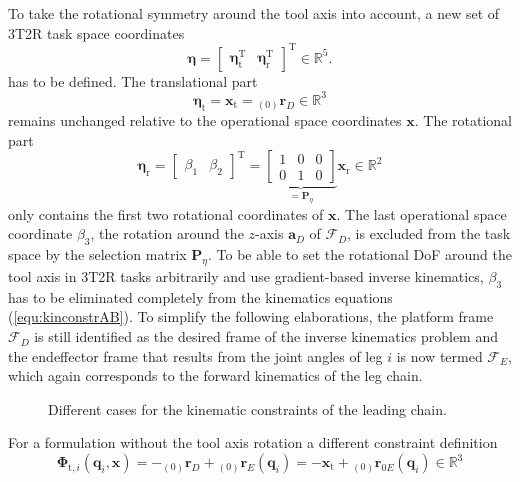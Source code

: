 \documentclass[robotics,article,submit,moreauthors,pdftex]{Definitions/mdpi}
\newcommand{\bm}[1]{\boldsymbol{#1}}
\newcommand{\ortvek}[4]{{ }_{(#1)}{\boldsymbol{#2}}^{#3}_{#4} }
\newcommand{\transp}[0]{{\mathrm{T}}}
\newcommand{\ks}[1]{{\mathcal{F}}_{#1}}
\begin{document}
To take the rotational symmetry around the tool axis into account, a new set of 3T2R task space coordinates
%
\begin{equation}
\bm{\eta}
=
\begin{bmatrix}
\bm{\eta}_{\mathrm{t}}^\transp & 
\bm{\eta}_{\mathrm{r}}^\transp
\end{bmatrix}^\transp
\in {\mathbb{R}}^{5}.
\end{equation}  
%
has to be defined.
The translational part
%
\begin{equation}
\bm{\eta}_{\mathrm{t}}
=
\bm{x}_{\mathrm{t}}
=
\ortvek{0}{r}{}{D}
\in {\mathbb{R}}^{3}
\end{equation}  
%
remains unchanged relative to the operational space coordinates $\bm{x}$.
The rotational part
%
\begin{equation}
\bm{\eta}_{\mathrm{r}}
=
\begin{bmatrix}
\beta_1  & \beta_2
\end{bmatrix}^\transp
=
\underbrace{\begin{bmatrix}
    1 & 0 & 0  \\ 
    0 & 1 & 0    \end{bmatrix}}_{=\bm{P}_{\eta}}
\bm{x}_{\mathrm{r}}
\in {\mathbb{R}}^{2}
\label{equ:etar_def}
\end{equation}
%
only contains the first two rotational coordinates of $\bm{x}$.
The last operational space coordinate $\beta_3$, the rotation around the $z$-axis $\bm{a}_{D}$ of $\ks{D}$, is excluded from the task space by the selection matrix $\bm{P}_{\eta}$.
To be able to set the rotational DoF around the tool axis in 3T2R tasks arbitrarily and use gradient-based inverse kinematics, $\beta_3$ has to be eliminated completely from the kinematics equations (\ref{equ:kinconstrAB}).
%
%
To simplify the following elaborations, the platform frame $\ks{D}$ is still identified as the desired frame of the inverse kinematics problem and the endeffector frame that results from the joint angles of leg $i$ is now termed $\ks{E}$, which again corresponds to the forward kinematics of the leg chain.
%
\begin{figure}[tb]
    
    \caption{Different cases for the kinematic constraints of the leading chain.}
    \label{fig:pkm_constr_rot_lead}
\end{figure} 
%
For a formulation without the tool axis rotation a different constraint definition
%
\begin{equation}
\bm{\Phi}_{\mathrm{t},i}(\bm{q}_i,\bm{x})
= 
- \ortvek{0}{r}{}{D} + \ortvek{0}{r}{}{E}(\bm{q}_i)
=
- \bm{x}_{\mathrm{t}} + \ortvek{0}{r}{}{0E}(\bm{q}_i) \in {\mathbb{R}}^{3}
\label{equ:Phit_def}
\end{equation}
\end{document}
